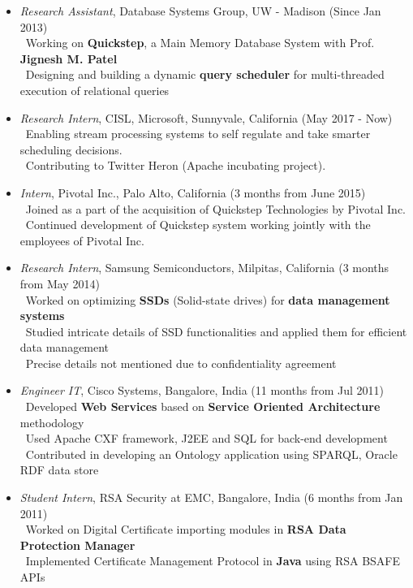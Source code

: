 \documentclass[11pt]{article}
\begin{document}
\begin{itemize}\addtolength{\itemsep}{-0.5\baselineskip}
	\item{\textit{Research Assistant}, Database Systems Group, UW - Madison \hfill (Since Jan 2013)}\\
		\textendash\ Working on \textbf{Quickstep}, a Main Memory Database System with Prof. \textbf{Jignesh M. Patel} \\
		\textendash\ Designing and building a dynamic \textbf{query scheduler} for multi-threaded execution of relational queries \\
	\item{\textit{Research Intern}, CISL, Microsoft, Sunnyvale, California \hfill (May 2017 - Now)}\\
	\textendash\ Enabling stream processing systems to self regulate and take smarter scheduling decisions. \\
	\textendash\ Contributing to Twitter Heron (Apache incubating project).\\
	\item{\textit{Intern}, Pivotal Inc., Palo Alto, California \hfill (3 months from June 2015)}\\
	\textendash\ Joined as a part of the acquisition of Quickstep Technologies by Pivotal Inc.\\
	\textendash\ Continued development of Quickstep system working jointly with the employees of Pivotal Inc.\\
	\item{\textit{Research Intern}, Samsung Semiconductors, Milpitas, California \hfill (3 months from May 2014)}\\
		\textendash\ Worked on optimizing \textbf{SSDs} (Solid-state drives) for \textbf{data management systems} \\
		\textendash\ Studied intricate details of SSD functionalities and applied them for efficient data management \\
		\textendash\ Precise details not mentioned due to confidentiality agreement\\
	\item{\textit{Engineer IT}, Cisco Systems, Bangalore, India \hfill (11 months from Jul 2011)}\\
		\textendash\ Developed \textbf{Web Services} based on \textbf{Service Oriented Architecture} methodology\\
		\textendash\ Used Apache CXF framework, J2EE and SQL for back-end development\\
		\textendash\ Contributed in developing an Ontology application using SPARQL, Oracle RDF data store\\
	\item{\textit{Student Intern}, RSA Security at EMC, Bangalore, India \hfill (6 months from Jan 2011)}\\
		\textendash\ Worked on Digital Certificate importing modules in \textbf{RSA Data Protection Manager}\\
		\textendash\ Implemented Certificate Management Protocol in \textbf{Java} using RSA BSAFE APIs\\
\end{itemize}
\end{document}

